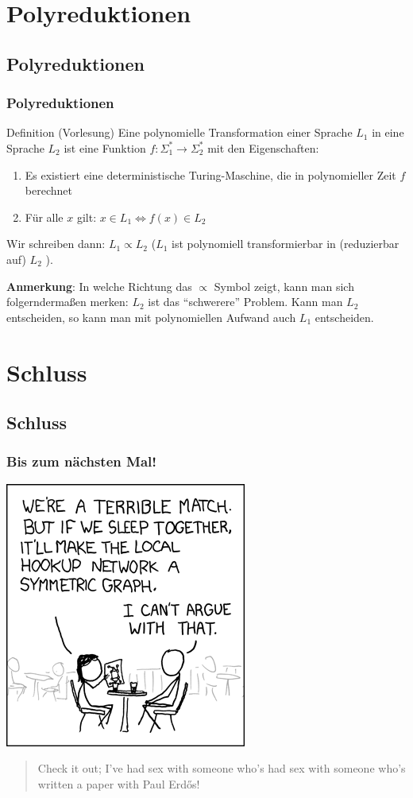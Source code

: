 \section{Polyreduktionen}
\subsection{Polyreduktionen}
\begin{frame}
\frametitle{Polyreduktionen}
\begin{block}{Definition (Vorlesung)}
Eine polynomielle Transformation einer Sprache $L_1$ in eine Sprache $L_2$ ist eine Funktion
$f: \Sigma^*_1 \rightarrow \Sigma^*_2$ mit den Eigenschaften:
\begin{enumerate}
\item Es existiert eine deterministische Turing-Maschine, die in polynomieller Zeit $f$ berechnet
\item Für alle $x$ gilt: $x \in L_1 \iff f(x) \in  L_2$
\end{enumerate}
Wir schreiben dann: $L_1 \propto L_2$ ($L_1$ ist polynomiell transformierbar in (reduzierbar auf) $L_2$ ).
\end{block}
\textbf{Anmerkung}: In welche Richtung das $\propto$ Symbol zeigt, kann man sich folgerndermaßen  merken:
$L_2$ ist das "`schwerere"' Problem. Kann man $L_2$ entscheiden, so kann man mit polynomiellen Aufwand auch $L_1$ entscheiden.
\end{frame}

\section{Schluss}
\subsection{Schluss}
\begin{frame}
	\frametitle{Bis zum nächsten Mal!}
	\begin{center}
		\includegraphics[scale=0.5]{images/xkcd-403.png}
	\end{center}

	\begin{quote}
		\scriptsize{Check it out; I've had sex with someone who's had sex with someone who's written a paper with Paul Erdős!}
	\end{quote}
\end{frame}


